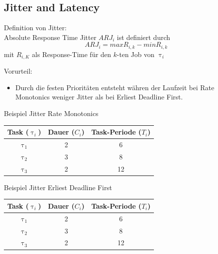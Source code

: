 

\subsection{Jitter and Latency}\label{JitterandLatency}

\begin{frame}{\subsecname}
	Definition von Jitter:\\
	Absolute Response Time Jitter $ARJ_i$ ist definiert durch
	\begin{equation}
		ARJ_i=max R_{i,k}-min R_{i,k}
	\end{equation} mit
	$R_{i,K}$ als Response-Time für den $k$-ten Job von $\uptau_i$
\end{frame}

\begin{frame}{\subsecname}
	Vorurteil:
	\begin{itemize}
		\item Durch die festen Prioritäten entsteht währen der Laufzeit bei Rate Monotonics weniger Jitter als bei Erliest Deadline First. 
	\end{itemize}
\end{frame}

\newcommand{\showRMSlideJit}[1] {\begin{frame}{Beispiel Jitter Rate Monotonics}
		\begin{center}
		\begin{tabular}{c||c|c}
			Task ($\uptau_i$) & Dauer ($C_i$) & Task-Periode ($T_i$)\\\hline\hline
			$\uptau_1$ & 2 & 6\\
			$\uptau_2$ & 3 & 8\\
			$\uptau_3$ & 2 & 12
		\end{tabular}
	\end{center}
	
\end{frame}}

%
{%
	\showRMSlideJit{\arabic{ct}}
}

\begin{frame}{Beispiel Jitter Erliest Deadline First}
		\begin{center}
		\begin{tabular}{c||c|c}
			Task ($\uptau_i$) & Dauer ($C_i$) & Task-Periode ($T_i$)\\\hline\hline
			$\uptau_1$ & 2 & 6\\
			$\uptau_2$ & 3 & 8\\
			$\uptau_3$ & 2 & 12
		\end{tabular}
	\end{center}
	
\end{frame}

